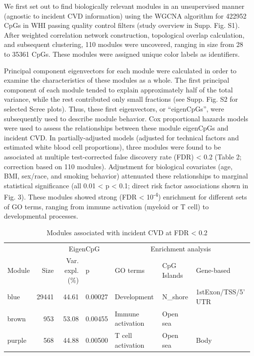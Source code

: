 \documentclass[]{bmcart}
\begin{document}
We first set out to find biologically relevant modules in an
unsupervised manner (agnostic to incident CVD information) using the
WGCNA algorithm for 422952 CpGs in WHI passing quality control filters
(study overview in Supp. Fig. S1). After weighted correlation network
construction, topological overlap calculation, and subsequent
clustering, 110 modules were uncovered, ranging in size from 28 to 35361
CpGs. These modules were assigned unique color labels as identifiers.

Principal component eigenvectors for each module were calculated in
order to examine the characteristics of these modules as a whole. The
first principal component of each module tended to explain approximately
half of the total variance, while the rest contributed only small
fractions (see Supp. Fig. S2 for selected Scree plots). Thus, these
first eigenvectors, or ``eigenCpGs'', were subsequently used to describe
module behavior. Cox proportional hazards models were used to assess the
relationships between these module eigenCpGs and incident CVD. In
partially-adjusted models (adjusted for technical factors and estimated
white blood cell proportions), three modules were found to be associated
at multiple test-corrected false discovery rate (FDR) \textless{} 0.2
(Table 2; correction based on 110 modules). Adjustment for biological
covariates (age, BMI, sex/race, and smoking behavior) attenuated these
relationships to marginal statistical significance (all 0.01 \textless{}
p \textless{} 0.1; direct risk factor associations shown in Fig. 3).
These modules showed strong (FDR \textless{} 10\textsuperscript{-4})
enrichment for different sets of GO terms, ranging from immune
activation (myeloid or T cell) to developmental processes.

\begin{table}[t]

\caption{\label{tab:sig-module-table}Modules associated with incident CVD at FDR < 0.2}
\centering
\begin{tabular}{lrrllll}
\toprule
\multicolumn{1}{c}{} & \multicolumn{1}{c}{} & \multicolumn{2}{c}{EigenCpG} & \multicolumn{3}{c}{Enrichment analysis} \\
\cmidrule(l{3pt}r{3pt}){3-4} \cmidrule(l{3pt}r{3pt}){5-7}
Module & Size & Var. expl. (\%) & p & GO terms & CpG Islands & Gene-based\\
\midrule
blue & 29441 & 44.61 & 0.00027 & Development & N\_shore & 1stExon/TSS/5' UTR\\
brown & 953 & 53.08 & 0.00455 & Immune activation & Open sea & \\
purple & 568 & 44.88 & 0.00500 & T cell activation & Open sea & Body\\
\bottomrule
\end{tabular}
\end{table}
\end{document}
